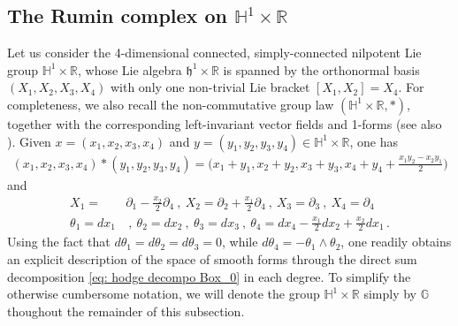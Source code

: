 \documentclass[dvipsnames]{amsart}
\theoremstyle{definition}
\theoremstyle{definition}
\numberwithin{equation}{section}
\newcommand{\R}{\mathbb{R}}
\newcommand{\G}{\mathbb{G}}
\renewcommand{\H}{\mathbb{H}}
\begin{document}
\subsection{The Rumin complex on $\mathbb H^1\times\R$}\label{subsection: rumin on HtimesR}Let us consider the 4-dimensional connected, simply-connected nilpotent Lie group $\mathbb H^1\times\R$, whose Lie algebra $\mathfrak{h}^1\times\R$ is spanned by the orthonormal basis $(X_1,X_2,X_3,X_4)$ with only one non-trivial Lie bracket $[X_1,X_2]=X_4$. For completeness, we also recall the non-commutative group law $(\mathbb H^1\times\R,\ast)$, together with the corresponding left-invariant vector fields and 1-forms (see also \cite{LeDonneTripaldi2021}). Given $x=(x_1,x_2,x_3,x_4)$ and $y=(y_1,y_2,y_3,y_4)\in\mathbb H^1\times\R$, one has
\begin{align*}
    (x_1,x_2,x_3,x_4)\ast(y_1,y_2,y_3,y_4)=\big(x_1+y_1,x_2+y_2,x_3+y_3,x_4+y_4+\tfrac{x_1y_2-x_2y_1}{2}\big)
\end{align*}
and
\begin{align*}
    X_1=&\partial_1-\frac{x_2}{2}\partial_4\ ,\ X_2=\partial_2+\frac{x_1}{2}\partial_4\ ,\ X_3=\partial_3\ ,\ X_4=\partial_4\\
    \theta_1=dx_1&\ ,\ \theta_2=dx_2\ ,\ \theta_3=dx_3\ ,\ \theta_4=dx_4-\frac{x_1}{2}dx_2+\frac{x_2}{2}dx_1\,.
\end{align*}
Using the fact that $d\theta_1=d\theta_2=d\theta_3=0$, while $d\theta_4=-\theta_1\wedge\theta_2$, one readily obtains an explicit description of the space of smooth forms through the direct sum decomposition \eqref{eq: hodge decompo Box_0} in each degree. To simplify the otherwise cumbersome notation, we will denote the group $\H^1\times\R$ simply by $\G$ thoughout the remainder of this subsection.
\end{document}
